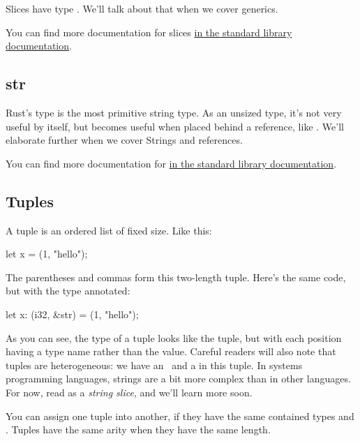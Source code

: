 Slices have type \code{\&[T]}. We'll talk about that  when we cover generics.

\blank

You can find more documentation for slices \href{https://doc.rust-lang.org/std/primitive.slice.html}{in the standard library documentation}.

\subsection*{str}

Rust's  type is the most primitive string type. As an unsized type, it's not very useful by itself, but becomes useful 
when placed behind a reference, like . We'll elaborate further when we cover Strings and references.

\blank

You can find more documentation for  \href{https://doc.rust-lang.org/std/primitive.str.html}{in the standard library
documentation}.

\subsection*{Tuples}

A tuple is an ordered list of fixed size. Like this:

\begin{rustc}
let x = (1, "hello");
\end{rustc}

The parentheses and commas form this two-length tuple. Here's the same code, but with the type annotated:

\begin{rustc}
let x: (i32, &str) = (1, "hello");
\end{rustc}

As you can see, the type of a tuple looks like the tuple, but with each position having a type name rather than the value. Careful 
readers will also note that tuples are heterogeneous: we have an \itt\ and a  in this tuple. In systems programming
languages, strings are a bit more complex than in other languages. For now, read  as a \emph{string slice}, and we'll 
learn more soon.

\blank

You can assign one tuple into another, if they have the same contained types and . Tuples have the same arity 
when they have the same length.


